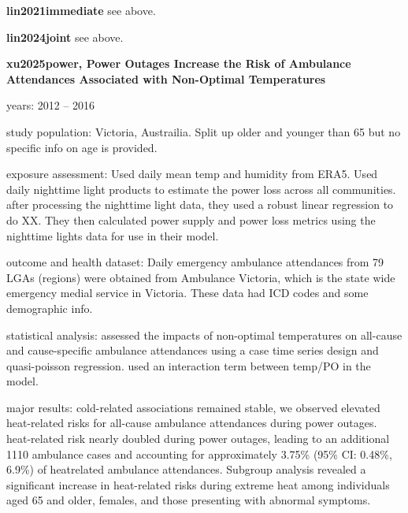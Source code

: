 \textbf{lin2021immediate}
see above.

\textbf{lin2024joint}
see above.

\textbf{xu2025power, Power Outages Increase the Risk of Ambulance Attendances Associated with Non-Optimal Temperatures}
    \item years: 2012 -- 2016
    \item study population: Victoria, Austrailia. Split up older and younger than 65 but no specific info on age is provided. 
    \item exposure assessment: Used daily mean temp and humidity from ERA5. Used daily nighttime light products to estimate the power loss across all communities. after processing the nighttime light data, they used a robust linear regression to do XX. They then calculated power supply and power loss metrics using the nighttime lights data for use in their model.  
    \item outcome and health dataset: Daily emergency ambulance attendances from 79 LGAs (regions) were obtained from Ambulance Victoria, which is the state wide emergency medial service in Victoria. These data had ICD codes and some demographic info. 
    \item statistical analysis: assessed the impacts of non-optimal temperatures on all-cause and cause-specific ambulance attendances using a case time series design and quasi-poisson regression. used an interaction term between temp/PO in the model. 
    \item major results: cold-related associations remained stable, we observed elevated heat-related risks for all-cause ambulance attendances during power outages. heat-related risk nearly doubled during power outages, leading to an additional 1110 ambulance cases and accounting for approximately 3.75\% (95\% CI: 0.48\%, 6.9\%) of heatrelated ambulance attendances. Subgroup analysis revealed a significant increase in heat-related risks during extreme heat among individuals aged 65 and older, females, and those presenting with abnormal symptoms.

